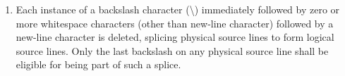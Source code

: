 \documentclass{wg21}
\begin{document}
\begin{enumerate}
\item
{}%
%
Each instance of a backslash character (\textbackslash)
immediately followed by zero or more whitespace characters (other than new-line character) followed by a new-line character is deleted, splicing
physical source lines to form logical source lines. Only the last
backslash on any physical source line shall be eligible for being part
of such a splice.
%
%
%

\end{enumerate}
\end{document}
